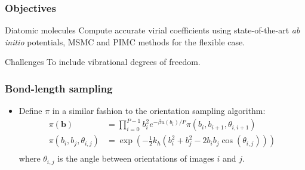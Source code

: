 \documentclass[xcolor=svgnames]{beamer}
\DeclareRobustCommand{\abinitio}[0]{\emph{ab initio}}
\begin{document}
        \begin{frame}
            \frametitle{Objectives}
            \begin{block}{Diatomic molecules}
                Compute accurate virial coefficients using state-of-the-art \abinitio{} potentials, MSMC and PIMC methods for the flexible case.
            \end{block}
                \begin{alertblock}{Challenges}
                    To include vibrational degrees of freedom.
                \end{alertblock}
        \end{frame}
        \begin{frame}
            \frametitle{Bond-length sampling}
            \begin{itemize}
                \item Define $\pi$ in a similar fashion to the orientation sampling algorithm:
                \begin{equation*}
                    \begin{aligned}
                        \pi(\mathbf{b}) &= \displaystyle\prod\limits_{i=0}^{P-1} b_i^2 e^{-\beta u(b_i)/P} \pi(b_i,b_{i+1},\theta_{i,i+1}) \\
                        \pi(b_i,b_j,\theta_{i,j}) &= \exp\left(-\frac{1}{2}  k_h  \left( b_i^2 + b_j^2 - 2  b_i  b_j  \cos (\theta_{i,j}) \right)\right)\\
                    \end{aligned}
                \end{equation*}
                where $\theta_{i,j}$ is the angle between orientations of images $i$ and $j$.
            \end{itemize}
        \end{frame}
\end{document}
